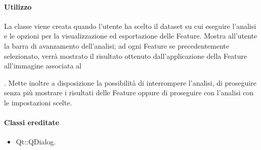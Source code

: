 \paragraph{Utilizzo\\}
La classe viene creata quando l'utente ha scelto il dataset\g{} su cui eseguire l'analisi e le opzioni per la visualizzazione ed esportazione delle Feature\g{}. Mostra all'utente la barra di avanzamento dell'analisi; ad ogni Feature\g{} se precedentemente selezionato, verrà mostrato il risultato ottenuto dall'applicazione della Feature\g{} all'immagine associata al \subject{}. Mette inoltre a disposizione la possibilità di interrompere l'analisi, di proseguire senza più mostrare i risultati delle Feature\g{} oppure di proseguire con l'analisi con le impostazioni scelte.
\paragraph{Classi ereditate\\}
\begin{itemize}
\item Qt::QDialog.
\end{itemize}

